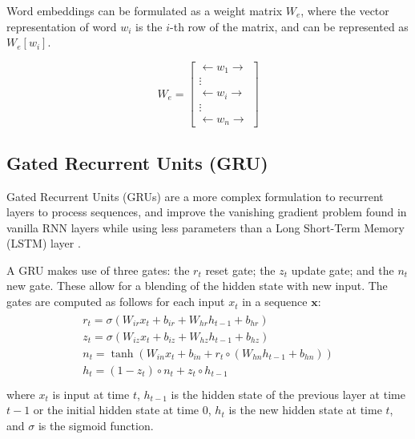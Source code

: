 \documentclass[twoside,twocolumn]{article}
\renewcommand{\vec}[1]{\mathbf{#1}}
\begin{document}
Word embeddings can be formulated as a weight matrix $W_e$, where the
vector representation of word $w_i$ is the $i$-th row of the matrix, and
can be represented as $W_e[w_i]$.

\begin{equation}
  W_e = \begin{bmatrix}
  \longleftarrow w_1 \longrightarrow \\
  \vdots\\
  \longleftarrow w_i \longrightarrow\\
  \vdots\\
  \longleftarrow w_n \longrightarrow
\end{bmatrix}
\end{equation}

\subsection{Gated Recurrent Units (GRU)}
\label{sec:gru}

Gated Recurrent Units (GRUs) are a more complex formulation to recurrent layers
to process sequences, and improve the vanishing gradient problem found in
vanilla RNN layers while using less parameters than a Long Short-Term Memory
(LSTM) layer \cite{cho2014learning}.

A GRU makes use of three gates: the $r_t$  reset gate; the $z_t$ update gate;
and the $n_t$ new gate. These allow for a blending of the hidden state with new input. The gates are computed as follows for each input $x_t$ in a sequence
$\vec{x}$:
\begin{equation}
  \begin{split}\begin{array}{ll}
  r_t = \sigma(W_{ir} x_t + b_{ir} + W_{hr} h_{t-1} + b_{hr}) \\
  z_t = \sigma(W_{iz} x_t + b_{iz} + W_{hz} h_{t-1} + b_{hz}) \\
  n_t = \tanh(W_{in} x_t + b_{in} + r_t \circ (W_{hn} h_{t-1}+ b_{hn})) \\
  h_t = (1 - z_t) \circ n_t + z_t \circ h_{t-1} \\
  \end{array}\end{split}
\end{equation}
where $x_t$ is input at time $t$, $h_{t-1}$ is the hidden state of the
previous layer at time $t-1$ or the initial hidden state at time $0$, $h_t$
is the new hidden state at time $t$, and $\sigma$ is the sigmoid function.
\end{document}
